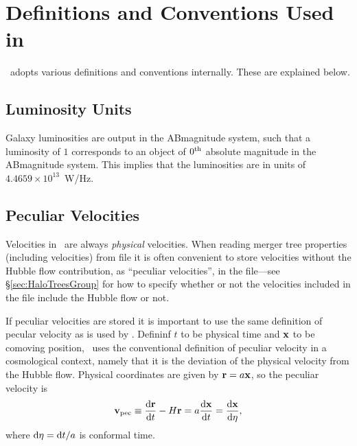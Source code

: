 \chapter{Definitions and Conventions Used in \glc}

\glc\ adopts various definitions and conventions internally. These are explained below.

\section{Luminosity Units}

Galaxy luminosities are output in the \gls{ABmagnitude} system, such that a luminosity of $1$ corresponds to an object of $0^{\rm th}$ absolute magnitude in the \gls{ABmagnitude} system. This implies that the luminosities are in units of $4.4659\times 10^{13}$~W/Hz.

\section{Peculiar Velocities}\label{sec:GalacticusVelocityDefinitions}

Velocities in \glc\ are always \emph{physical} velocities. When reading merger tree properties (including velocities) from file it is often convenient to store velocities without the Hubble flow contribution, as ``peculiar velocities'', in the file---see \S\ref{sec:HaloTreesGroup} for how to specify whether or not  the velocities included in the file include the Hubble flow or not.

If peculiar velocities are stored it is important to use the same definition of pecular velocity as is used by \glc. Defininf $t$ to be physical time and ${\bf x}$ to be comoving position, \glc\ uses the conventional definition of peculiar velocity in a cosmological context, namely that it is the deviation of the physical velocity from the Hubble flow. Physical coordinates are given by ${\bf r} = a{\bf x}$, so the peculiar velocity is
\begin{equation}
{\bf v}_{\rm pec} \equiv {{\rm d} {\bf r} \over {\rm d} t} - H {\bf r} = a {{\rm d} {\bf x}\over{\rm d} t} = {{\rm d}{\bf x}\over{\rm d}\eta},
\end{equation}
where ${\rm d}\eta = {\rm d}t/a$ is conformal time. 

